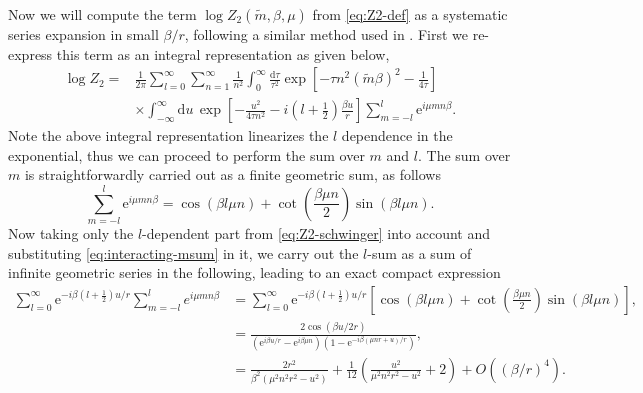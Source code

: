 \documentclass[a4paper,11pt]{article}
\newcommand{\e}{\mathrm e}
\newcommand{\dd}{\mathrm d}
\begin{document}
Now we will compute the term $\log Z_2(\tilde{m},\beta,\mu)$ from \eqref{eq:Z2-def} as a systematic series expansion in small $\beta/r$, following a similar method used in \cite{David:2024pir}. First we re-express this term as an integral representation as given below,
\begin{align}
 \log Z_2
 ={}&\frac{1}{2\pi}
 \sum_{l=0}^{\infty}\sum_{n=1}^{\infty}\frac{1}{n^2}
 \int_0^{\infty}\frac{\dd\tau}{\tau^2}
 \exp\!\left[-\tau n^2(\tilde m\beta)^2-\frac{1}{4\tau}\right]
 \nonumber\\
 &\times\int_{-\infty}^{\infty}\dd u\,
 \exp\!\left[-\frac{u^2}{4\tau n^2}
 -i\left(l+\frac12\right)\frac{\beta u}{r}\right]
 \sum_{m=-l}^{l}\e^{i\mu mn\beta}.
 \label{eq:Z2-schwinger}
\end{align}
Note the above integral representation linearizes the $l$ dependence in the exponential,  thus we can proceed to perform the sum over $m$ and $l$.
The sum over $m$ is straightforwardly carried out as a finite geometric sum, as follows
\begin{equation}
 \sum_{m=-l}^{l}\e^{i\mu mn\beta}
 =\cos(\beta l\mu n)
 +\cot\!\left(\frac{\beta\mu n}{2}\right)
 \sin(\beta l\mu n).
 \label{eq:interacting-msum}
\end{equation}
Now taking only the $l$-dependent part from \eqref{eq:Z2-schwinger} into account  and substituting \eqref{eq:interacting-msum} in it, we carry out the $l$-sum  as a sum of infinite geometric series in the following, leading to an exact compact expression
%
\begin{align}
 \sum_{l=0}^{\infty}
 \e^{-i\beta(l+\frac12)u/r}
 \sum_{m=-l}^{l} e^{i\mu mn\beta}& =
 \sum_{l=0}^{\infty}
 \e^{-i\beta(l+\frac12)u/r}
 \left[
 \cos(\beta l\mu n)
 +\cot\!\left(\frac{\beta\mu n}{2}\right)
 \sin(\beta l\mu n)
 \right]\nonumber,\\
 &=
 \frac{2\cos(\beta u/2r)}
 {(\e^{i\beta u/r}-\e^{i\beta\mu n})
  (1-\e^{-i\beta(\mu nr+u)/r})}\nonumber,\\
  &
 =
 \frac{2r^2}{\beta^2(\mu^2n^2r^2-u^2)}
 +\frac1{12}\left(
 \frac{u^2}{\mu^2n^2r^2-u^2}+2
 \right)
 +O\!\left((\beta/r)^4\right).
 \label{eq:Sn-highT}
\end{align}
\end{document}
